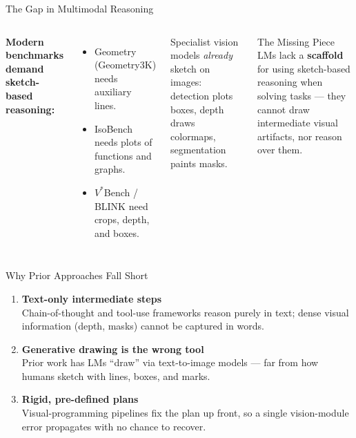 \documentclass[aspectratio=169]{beamer}
\begin{document}
\begin{frame}{The Gap in Multimodal Reasoning}
  \begin{columns}
    \textbf{Modern benchmarks demand sketch-based reasoning:}
    \begin{itemize}
      \item Geometry (Geometry3K) needs auxiliary lines.
      \item IsoBench needs plots of functions and graphs.
      \item $V^*$Bench / BLINK need crops, depth, and boxes.
    \end{itemize}
    \vspace{0.3cm}
    Specialist vision models \emph{already} sketch on images: detection
    plots boxes, depth draws colormaps, segmentation paints masks.
    \begin{alertblock}{The Missing Piece}
      LMs lack a \textbf{scaffold} for using sketch-based reasoning when
      solving tasks --- they cannot draw intermediate visual artifacts,
      nor reason over them.
    \end{alertblock}
  \end{columns}
\end{frame}

\begin{frame}{Why Prior Approaches Fall Short}
  \begin{enumerate}
    \setlength{\itemsep}{0.7cm}
    \item \textbf{\textcolor{sharifblue}{Text-only intermediate steps}}\\
      Chain-of-thought and tool-use frameworks reason purely in text;
      dense visual information (depth, masks) cannot be captured in words.
    \item \textbf{\textcolor{sharifblue}{Generative drawing is the wrong tool}}\\
      Prior work has LMs ``draw'' via text-to-image models --- far from how
      humans sketch with lines, boxes, and marks.
    \item \textbf{\textcolor{sharifblue}{Rigid, pre-defined plans}}\\
      Visual-programming pipelines fix the plan up front, so a single
      vision-module error propagates with no chance to recover.
  \end{enumerate}
\end{frame}
\end{document}
